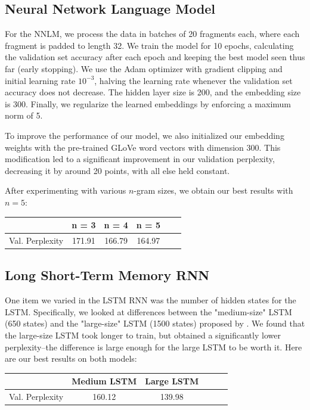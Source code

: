 \documentclass[11pt]{article}
\begin{document}
\subsection{Neural Network Language Model}
For the NNLM, we process the data in batches of 20 fragments each, where each fragment is padded to length 32. We train the model for 10 epochs, calculating the validation set accuracy after each epoch and keeping the best model seen thus far (early stopping). We use the Adam optimizer with gradient clipping and initial learning rate $10^{-3}$, halving the learning rate whenever the validation set accuracy does not decrease. The hidden layer size is 200, and the embedding size is 300. Finally, we regularize the learned embeddings by enforcing a maximum norm of 5.  

To improve the performance of our model, we also initialized our embedding weights with the pre-trained GLoVe word vectors with dimension 300. This modification led to a significant improvement in our validation perplexity, decreasing it by around 20 points, with all else held constant.

After experimenting with various $n$-gram sizes, we obtain our best results with $n=5$:
\begin{center}
	\begin{tabular}{ c | c c c c c}
		& n = 3 & n = 4 & n = 5  \\
		\hline
		Val. Perplexity & 171.91 & 166.79 & 164.97
	\end{tabular}
\end{center} 

\subsection{Long Short-Term Memory RNN}
One item we varied in the LSTM RNN was the number of hidden states for the LSTM. Specifically, we looked at differences between the "medium-size" LSTM (650 states) and the "large-size" LSTM (1500 states) proposed by \cite{lstm}. We found that the large-size LSTM took longer to train, but obtained a significantly lower perplexity--the difference is large enough for the large LSTM to be worth it. Here are our best results on both models:
\begin{center}
	\begin{tabular}{ c | c c c c c}
		 & Medium LSTM & Large LSTM  \\
		\hline
		Val. Perplexity & 160.12 & 139.98 
	\end{tabular}
\end{center} 
\end{document}
